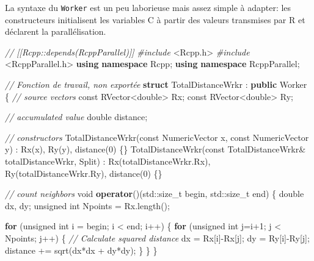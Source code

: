 \documentclass[
  12pt,
  french,
  a4paper,
  extrafontsizes,onecolumn,openright
  ]{memoir}
\newenvironment{Shaded}{\begin{snugshade}}{\end{snugshade}}
\newcommand{\AttributeTok}[1]{\textcolor[rgb]{0.77,0.63,0.00}{#1}}
\newcommand{\BuiltInTok}[1]{#1}
\newcommand{\CommentTok}[1]{\textcolor[rgb]{0.56,0.35,0.01}{\textit{#1}}}
\newcommand{\ControlFlowTok}[1]{\textcolor[rgb]{0.13,0.29,0.53}{\textbf{#1}}}
\newcommand{\DataTypeTok}[1]{\textcolor[rgb]{0.13,0.29,0.53}{#1}}
\newcommand{\DecValTok}[1]{\textcolor[rgb]{0.00,0.00,0.81}{#1}}
\newcommand{\ImportTok}[1]{#1}
\newcommand{\KeywordTok}[1]{\textcolor[rgb]{0.13,0.29,0.53}{\textbf{#1}}}
\newcommand{\NormalTok}[1]{#1}
\newcommand{\PreprocessorTok}[1]{\textcolor[rgb]{0.56,0.35,0.01}{\textit{#1}}}
\begin{document}
La syntaxe du \texttt{Worker} est un peu laborieuse mais assez simple à adapter: les constructeurs initialisent les variables C à partir des valeurs transmises par R et déclarent la parallélisation.

\scriptsize

\begin{Shaded}
\begin{Highlighting}[]
\CommentTok{// [[Rcpp::depends(RcppParallel)]]}
\PreprocessorTok{#include }\ImportTok{<Rcpp.h>}
\PreprocessorTok{#include }\ImportTok{<RcppParallel.h>}
\KeywordTok{using} \KeywordTok{namespace}\NormalTok{ Rcpp;}
\KeywordTok{using} \KeywordTok{namespace}\NormalTok{ RcppParallel;}

\CommentTok{// Fonction de travail, non exportée}
\KeywordTok{struct}\NormalTok{ TotalDistanceWrkr : }\KeywordTok{public}\NormalTok{ Worker}
\NormalTok{\{}
  \CommentTok{// source vectors}
  \AttributeTok{const}\NormalTok{ RVector<}\DataTypeTok{double}\NormalTok{> Rx;}
  \AttributeTok{const}\NormalTok{ RVector<}\DataTypeTok{double}\NormalTok{> Ry;}
  
  \CommentTok{// accumulated value}
  \DataTypeTok{double}\NormalTok{ distance;}
   
  \CommentTok{// constructors}
\NormalTok{  TotalDistanceWrkr(}\AttributeTok{const}\NormalTok{ NumericVector x, }\AttributeTok{const}\NormalTok{ NumericVector y) :}
\NormalTok{    Rx(x), Ry(y), distance(}\DecValTok{0}\NormalTok{) \{\}}
\NormalTok{  TotalDistanceWrkr(}\AttributeTok{const}\NormalTok{ TotalDistanceWrkr& totalDistanceWrkr, Split) :}
\NormalTok{    Rx(totalDistanceWrkr.Rx), Ry(totalDistanceWrkr.Ry),  distance(}\DecValTok{0}\NormalTok{) \{\}}
  
  \CommentTok{// count neighbors}
  \DataTypeTok{void} \KeywordTok{operator}\NormalTok{()(}\BuiltInTok{std::}\NormalTok{size_t begin, }\BuiltInTok{std::}\NormalTok{size_t end) \{}
    \DataTypeTok{double}\NormalTok{ dx, dy;}
    \DataTypeTok{unsigned} \DataTypeTok{int}\NormalTok{ Npoints = Rx.length();}

    \ControlFlowTok{for}\NormalTok{ (}\DataTypeTok{unsigned} \DataTypeTok{int}\NormalTok{ i = begin; i < end; i++) \{}
      \ControlFlowTok{for}\NormalTok{ (}\DataTypeTok{unsigned} \DataTypeTok{int}\NormalTok{ j=i+}\DecValTok{1}\NormalTok{; j < Npoints; j++) \{}
          \CommentTok{// Calculate squared distance}
\NormalTok{          dx = Rx[i]-Rx[j];}
\NormalTok{          dy = Ry[i]-Ry[j];}
\NormalTok{          distance += sqrt(dx*dx + dy*dy);}
\NormalTok{      \}}
\NormalTok{    \}}
\NormalTok{  \}}


\end{Highlighting}
\end{Shaded}
\end{document}
